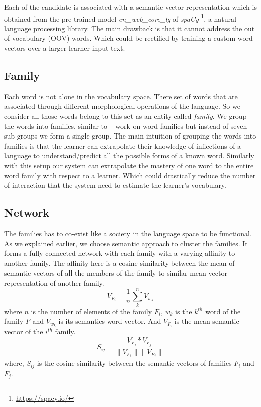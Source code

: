 \documentclass[11pt,a4paper]{article}
\begin{document}
Each of the candidate is associated with a semantic vector representation which is obtained from the pre-trained model \emph{en\_web\_core\_lg} of \emph{spaCy} \footnote{\url{https://spacy.io/}}, a natural language processing library. The main drawback is that it cannot address the out of vocabulary (OOV) words. Which could be rectified by training a custom word vectors over a larger learner input text.

\subsection{Family}
Each word is not alone in the vocabulary space. There set of words that are associated through different morphological operations of the language. So we consider all those words belong to this set as an entity called \textit{family}.
We group the words into families, similar to ~\cite{bauer1993word} work on word families but instead of seven sub-groups we form a single group. The main intuition of grouping the words into families is that the learner can extrapolate their knowledge of inflections of a language to understand/predict all the possible forms of a known word. Similarly with this setup our system can extrapolate the mastery of one word to the entire word family with respect to a learner. Which could drastically reduce the number of interaction that the system need to estimate the learner's vocabulary.

\subsection{Network}
The families has to co-exist like a society in the language space to be functional. As we explained earlier, we choose semantic approach to cluster the families. It forms a fully connected network with each family with a varying affinity to another family. The affinity here is a cosine similarity between the mean of semantic vectors of all the members of the family to similar mean vector representation of another family.
\begin{equation}
  V_{F_i} = \frac{1}{n} \sum_{k}^{n} V_{w_k}
\end{equation}
where ${n}$ is the number of elements of the family ${F_i}$, ${w_k}$ is the ${k^{th}}$ word of the family ${F}$ and ${V_{w_{k}}}$ is its semantics word vector. And ${V_{F_{i}}}$ is the mean semantic vector of the ${i^{th}}$ family.
\begin{equation}
  S_{ij} = \frac{V_{F_i} * V_{F_j}}{\|V_{F_i}\|  \|V_{F_j}\|}
\end{equation}
where, ${S_{ij}}$ is the cosine similarity between the semantic vectors of families ${F_i}$ and ${F_j}$.
\end{document}
